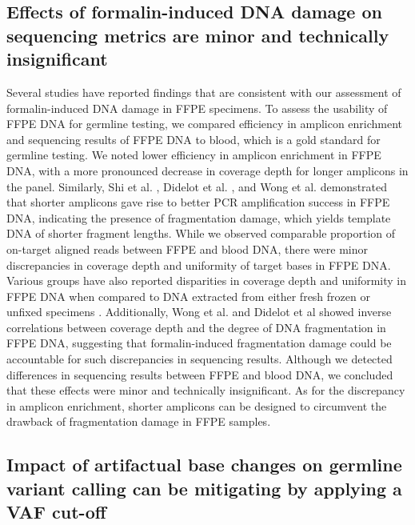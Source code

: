 \subsection{Effects of formalin-induced DNA damage on sequencing metrics are minor and technically insignificant}

Several studies have reported findings that are consistent with our assessment of formalin-induced DNA damage in FFPE specimens. To assess the usability of FFPE DNA for germline testing, we compared efficiency in amplicon enrichment and sequencing results of FFPE DNA to blood, which is a gold standard for germline testing. We noted lower efficiency in amplicon enrichment in FFPE DNA, with a more pronounced decrease in coverage depth for longer amplicons in the panel. Similarly, Shi et al. \cite{Shi2002}, Didelot et al. \cite{Didelot2013}, and Wong et al. \cite{Wong2013} demonstrated that shorter amplicons gave rise to better PCR amplification success in FFPE DNA, indicating the presence of fragmentation damage, which yields template DNA of shorter fragment lengths. While we observed comparable proportion of on-target aligned reads between FFPE and blood DNA, there were minor discrepancies in coverage depth and uniformity of target bases in FFPE DNA. Various groups have also reported disparities in coverage depth and uniformity in FFPE DNA when compared to DNA extracted from either fresh frozen or unfixed specimens \cite{Wong2013, Betge2015, Spencer2013}. Additionally, Wong et al. \cite{Wong2014} and Didelot et al \cite{Didelot2013} showed inverse correlations between coverage depth and the degree of DNA fragmentation in FFPE DNA, suggesting that formalin-induced fragmentation damage could be accountable for such discrepancies in sequencing results. Although we detected differences in sequencing results between FFPE and blood DNA, we concluded that these effects were minor and technically insignificant. As for the discrepancy in amplicon enrichment, shorter amplicons can be designed to circumvent the drawback of fragmentation damage in FFPE samples.

\subsection{Impact of artifactual base changes on germline variant calling can be mitigating by applying a VAF cut-off}

